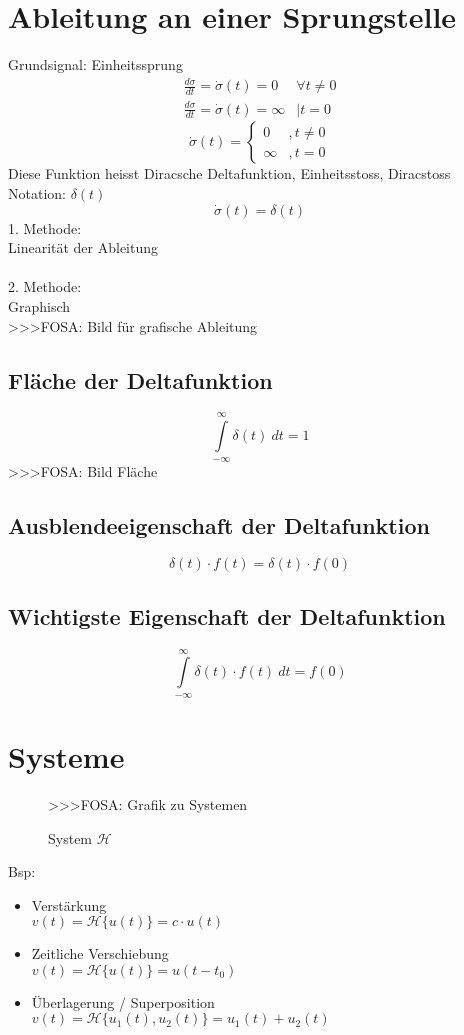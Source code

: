 \section{Ableitung an einer Sprungstelle}
Grundsignal: Einheitssprung\\
\[ \boxed{\begin{array}{ll}
\frac{d \sigma}{d t} = \dot{\sigma}(t) = 0 & \forall t \neq 0 \\
\frac{d \sigma}{d t} = \dot{\sigma}(t) = \infty & | t =   0
\end{array}
} \]
\[ \boxed{\dot{\sigma}(t) = \left\lbrace 
\begin{array}{ll}0&, t \neq 0\\\infty&, t = 0\end{array} \right.} \]
Diese Funktion heisst Diracsche Deltafunktion, Einheitsstoss, Diracstoss\\
Notation: $\delta(t)$
\[ \boxed{\dot{\sigma}(t) = \delta(t)} \]
1. Methode: \\
Linearität der Ableitung\\\\
2. Methode: \\
Graphisch\\
>>>FOSA: Bild für grafische Ableitung\\

\subsection{Fläche der Deltafunktion}
\[ \boxed{\int\limits_{-\infty}^{\infty} \delta(t) ~ dt = 1} \]
>>>FOSA: Bild Fläche

\subsection{Ausblendeeigenschaft der Deltafunktion}
\[ \boxed{\delta(t) \cdot f(t) = \delta(t) \cdot f(0)} \]

\subsection{Wichtigste Eigenschaft der Deltafunktion}
\[ \boxed{\int\limits_{-\infty}^{\infty} \delta(t) \cdot f(t) ~ dt = f(0)} \]

\section{Systeme}
\begin{figure}
    \centering
    >>>FOSA: Grafik zu Systemen
    \caption{System $\mathcal{H}$}
    \label{fig:system}
\end{figure}
Bsp: 
\begin{itemize}
  \item Verstärkung \\
        $v(t) = \mathcal{H} \lbrace u(t) \rbrace = c \cdot u(t)$
  \item Zeitliche Verschiebung \\
        $v(t) = \mathcal{H} \lbrace u(t) \rbrace = u(t - t_0)$
  \item Überlagerung / Superposition \\
        $v(t) = \mathcal{H} \lbrace u_1(t), u_2(t) \rbrace = u_1(t) + u_2(t)$
\end{itemize}
